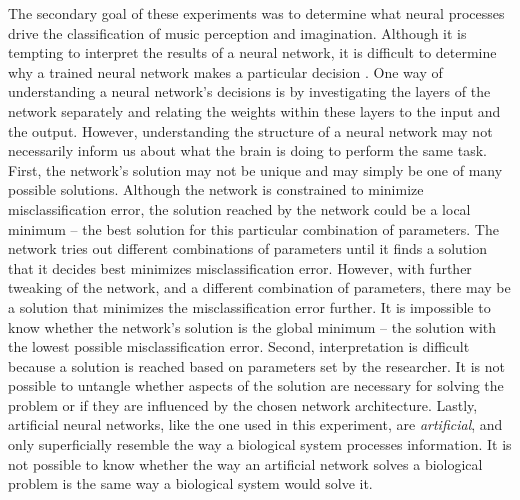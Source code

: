 The secondary goal of these experiments was to determine what neural processes drive the classification of music perception and imagination.
Although it is tempting to interpret the results of a neural network, it is difficult to determine why a trained neural network makes a particular decision \cite{towell_1992_interpretation}.
One way of understanding a neural network's decisions is by investigating the layers of the network separately and relating the weights within these layers to the input and the output. 
However, understanding the structure of a neural network may not necessarily inform us about what the brain is doing to perform the same task. 
First, the network's solution may not be unique and may simply be one of many possible solutions. 
Although the network is constrained to minimize misclassification error, the solution reached by the network could be a local minimum -- the best solution for this particular combination of parameters.
The network tries out different combinations of parameters until it finds a solution that it decides best minimizes misclassification error. 
However, with further tweaking of the network, and a different combination of parameters, there may be a solution that minimizes the misclassification error further.
It is impossible to know whether the network's solution is the global minimum -- the solution with the lowest possible misclassification error.
Second, interpretation is difficult because a solution is reached based on parameters set by the researcher. 
It is not possible to untangle whether aspects of the solution are necessary for solving the problem or if they are influenced by the chosen network architecture. 
Lastly, artificial neural networks, like the one used in this experiment, are \emph{artificial}, and only superficially resemble the way a biological system processes information. 
It is not possible to know whether the way an artificial network solves a biological problem is the same way a biological system would solve it. 

